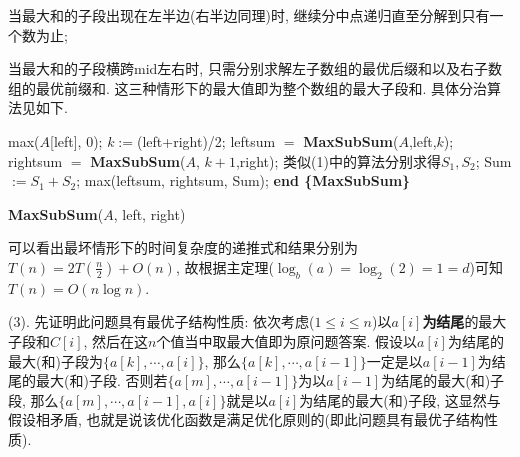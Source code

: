 \documentclass{article}
\begin{document}
\begin{homeworkProblem}
	当最大和的子段出现在左半边(右半边同理)时, 继续分中点递归直至分解到只有一个数为止;

	当最大和的子段横跨mid左右时, 只需分别求解左子数组的最优后缀和以及右子数组的最优前缀和. 这三种情形下的最大值即为整个数组的最大子段和. 具体分治算法见如下.
	\begin{algorithm}[H]
		\begin{algorithmic}[1]
			\State \Return max($A$[left], 0);
		\EndIf
		\State $k:=$(left+right)/2;
		\State leftsum $=$ \textbf{MaxSubSum}($A$,left,$k$);
		\State rightsum $=$ \textbf{MaxSubSum}($A$, $k+1$,right);
		\State 类似(1)中的算法分别求得$S_1,S_2$;
		\State Sum$:=S_1+S_2$;
		\State \Return max(leftsum, rightsum, Sum);
		\State \textbf{end \{MaxSubSum\}}
		\end{algorithmic}
		\caption{\textbf{MaxSubSum}($A$, left, right)}
		\label{alg:MaxSubSum}
	\end{algorithm}
	
	可以看出最坏情形下的时间复杂度的递推式和结果分别为$T\left( n \right) =2T\left( \frac{n}{2} \right) +O\left( n \right)
	$, 故根据主定理($\log_b(a)=\log_2(2)=1=d$)可知$T(n)=O(n\log n)$.
	

	(3). 先证明此问题具有最优子结构性质: 依次考虑($1\leq i\leq n$)以$a[i]$\textbf{为结尾}的最大子段和$C[i]$, 然后在这$n$个值当中取最大值即为原问题答案. 假设以$a[i]$为结尾的最大(和)子段为$\{a[k],\cdots,a[i]\}$, 那么$\{a[k],\cdots,a[i-1]\}$一定是以$a[i-1]$为结尾的最大(和)子段. 否则若$\{a[m],\cdots,a[i-1]\}$为以$a[i-1]$为结尾的最大(和)子段, 那么$\{a[m],\cdots,a[i-1],a[i]\}$就是以$a[i]$为结尾的最大(和)子段, 这显然与假设相矛盾, 也就是说该优化函数是满足优化原则的(即此问题具有最优子结构性质). 


\end{homeworkProblem}
\end{document}
